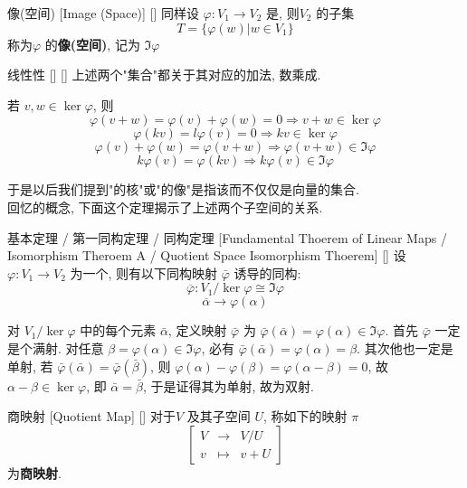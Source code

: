 \documentclass[UTF8]{ctexart}
\DeclareMathOperator{\0}{\mathbf{0}}
\DeclareMathOperator{\<}{\langle}
\renewcommand{\>}{\rangle}
\begin{document}
        \begin{dfn}
			[]
			{像(空间)}
			[Image (Space)]
			[]
            同样设 \(\varphi:V_1\to V_2\) 是, 则 \(V_2\) 的子集
            \[T=\{\varphi (w)|w\in V_1\}\]
            称为 \(\varphi\) 的\textbf{像(空间)}, 记为 \(\Im\varphi\) 
        \end{dfn}
        \begin{ppt}
			[]
			{线性性}
			[]
			[]
            上述两个"集合"都关于其对应的加法, 数乘成.
        \end{ppt}
        \begin{prf}
            若 \(v,w\in \ker\varphi\), 则
            \[\varphi(v+w)=\varphi(v)+\varphi(w)=0\Longrightarrow v+w\in\ker\varphi\]
            \[\varphi(kv)=l\varphi(v)=0\Longrightarrow kv\in\ker\varphi\]
            \[\varphi(v)+\varphi(w)=\varphi(v+w)\Longrightarrow\varphi(v+w)\in\Im\varphi\]
            \[k\varphi(v)=\varphi(kv)\Longrightarrow k\varphi(v)\in\Im\varphi\]
        \end{prf}
        于是以后我们提到" 的核"或" 的像"是指该 而不仅仅是向量的集合.\\
        回忆 的概念, 下面这个定理揭示了上述两个子空间的关系.
        
        \begin{thm}
			[]
			{ 基本定理 / 第一同构定理 / \商空间 同构定理}
			[Fundamental Thoerem of Linear Maps / Isomorphism Theroem A / Quotient Space Isomorphism Thoerem]
			[]
			设 \(\varphi:V_1\to V_2\) 为一个, 则有以下同构映射 \(\bar{\varphi}\) 诱导的同构:
			\[\overline{\varphi}:V_1/\ker\varphi\cong\Im\varphi\]
			\[\overline{\alpha}\to\varphi(\alpha)\]
			\end{thm}
			\begin{prf}
			对 \(V_1/\ker\varphi\) 中的每个元素 \(\bar{\alpha}\), 定义映射 \(\bar{\varphi}\) 为 \(\bar{\varphi}(\bar{\alpha})=\varphi(\alpha)\in\Im\varphi\). 
			首先 \(\bar{\varphi}\) 一定是个满射. 对任意 \(\beta=\varphi(\alpha)\in\Im\varphi\), 必有 \(\bar{\varphi}(\bar{\alpha})=\varphi(\alpha)=\beta\). 其次他也一定是单射, 若 \(\bar{\varphi}(\bar{\alpha})=\bar{\varphi}(\bar{\beta})\), 则 \(\varphi(\alpha)-\varphi(\beta)=\varphi(\alpha-\beta)=0\), 故 \(\alpha-\beta\in\ker\varphi\), 即 \(\bar{\alpha}=\bar{\beta}\), 于是证得其为单射, 故为双射.
        \end{prf}

		\begin{dfn}
			[]
			{商映射}
			[Quotient Map]
			[]
			对于 \(V\) 及其子空间 \(U\), 称如下的映射 \(\pi\) 
			\[\begin{bmatrix}
				V&\to&V/U\\
				v&\mapsto&v+U 
			\end{bmatrix}\]
			为\textbf{商映射}.
		\end{dfn}
\end{document}
